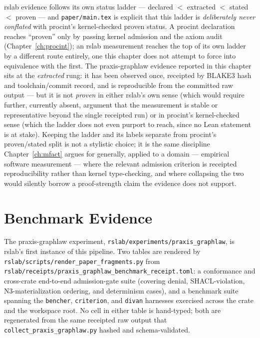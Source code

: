 rslab evidence follows its own status ladder --- declared $<$ extracted
$<$ stated $<$ proven --- and \texttt{paper/main.tex} is explicit that
this ladder is \emph{deliberately never conflated} with \textsf{procint}'s
kernel-checked proven status. A \textsf{procint} declaration reaches
``proven'' only by passing kernel admission and the axiom audit
(Chapter~\ref{ch:procint}); an rslab measurement reaches the top of its
own ladder by a different route entirely, one this chapter does not
attempt to force into equivalence with the first. The praxis-graphlaw
evidence reported in this chapter sits at the \emph{extracted} rung: it
has been observed once, receipted by BLAKE3 hash and toolchain/commit
record, and is reproducible from the committed raw output --- but it is
not \emph{proven} in either rslab's own sense (which would require
further, currently absent, argument that the measurement is stable or
representative beyond the single receipted run) or in \textsf{procint}'s
kernel-checked sense (which the ladder does not even purport to reach,
since no Lean statement is at stake). Keeping the ladder and its labels
separate from \textsf{procint}'s proven/stated split is not a stylistic
choice; it is the same discipline Chapter~\ref{ch:mfact} argues for
generally, applied to a domain --- empirical software measurement ---
where the relevant admission criterion is receipted reproducibility
rather than kernel type-checking, and where collapsing the two would
silently borrow a proof-strength claim the evidence does not support.

\section{Benchmark Evidence}
\label{sec:emp-benchmark}

The praxis-graphlaw experiment, \texttt{rslab/experiments/praxis\_graphlaw},
is rslab's first instance of this pipeline. Two tables are rendered by
\texttt{rslab/scripts/render\_paper\_fragments.py} from
\texttt{rslab/receipts/praxis\_graphlaw\_benchmark\_receipt.toml}: a
conformance and cross-crate end-to-end admission-gate suite (covering
denial, SHACL-violation, N3-materialization ordering, and determinism
cases), and a benchmark suite spanning the \texttt{bencher},
\texttt{criterion}, and \texttt{divan} harnesses exercised across the
crate and the workspace root. No cell in either table is hand-typed;
both are regenerated from the same receipted raw output that
\texttt{collect\_praxis\_graphlaw.py} hashed and schema-validated.

